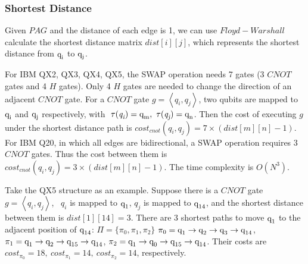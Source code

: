 \documentclass[runningheads]{llncs}
\begin{document}
\subsubsection{Shortest Distance}
Given $PAG$ and the distance of each edge is 1, we can use $Floyd-Warshall$ calculate the shortest distance matrix $dist[i][j]$, which represents the shortest distance from $\textup{q}_{\textup{i}}$ to $\textup{q}_{\textup{j}}$. 

For IBM QX2, QX3, QX4, QX5, the SWAP operation needs 7 gates (3 $CNOT$ gates and 4 $H$ gates). Only 4 $H$ gates are needed to change the direction of an adjacent $CNOT$ gate. 
For a $CNOT$ gate $g=\left \langle  \textit{q}_\textit{i},\textit{q}_\textit{j} \right \rangle $,
two qubits are mapped to $\textup{q}_{\textup{i}}$ and $\textup{q}_{\textup{j}}$ respectively, with $\ \tau(\textit{q}_\textit{i})=\textup{q}_{\textup{m}},\ \tau(\textit{q}_\textit{j})=\textup{q}_{\textup{n}}$. Then the cost of executing $g$ under the shortest distance path is $cost_{cnot}(\textit{q}_\textit{i},\textit{q}_\textit{j})=7 \times( dist[m][n]-1)$. For IBM Q20, in which all edges are bidirectional, a SWAP operation requires 3 $CNOT$ gates. Thus the cost between them is $cost_{cnot}(\textit{q}_\textit{i},\textit{q}_\textit{j})=3 \times( dist[m][n]-1)$. The time complexity is $O (N^{3})$.
\begin{example}
	Take the QX5 structure as an example. Suppose there is a $CNOT$ gate $g=\left \langle  \textit{q}_\textit{i}, \textit{q}_\textit{j} \right \rangle $, \ $\textit{q}_\textit{i}$ is mapped to $\textup{q}_{1}$,  $\textit{q}_\textit{j}$ is mapped to $\textup{q}_{\textup{14}}$, and the shortest distance between them  is $dist[1][14]=3$. There are 3 shortest paths to move $\textup{q}_{\textup{1}}$ to the adjacent position of 
$\textup{q}_{\textup{14}}$:
$\Pi=\{\pi_{0},\pi_{1},\pi_{2}\}$
$\pi_{0}={\textup{q}_{\textup{1}}\rightarrow \textup{q}_{\textup{2}} \rightarrow \textup{q}_{\textup{3}} \rightarrow \textup{q}_{\textup{14}}}$,
$\pi_{1}={\textup{q}_{\textup{1}}\rightarrow \textup{q}_{\textup{2}} \rightarrow \textup{q}_{\textup{15}} \rightarrow \textup{q}_{\textup{14}}}$,
$\pi_{2}={\textup{q}_{\textup{1}}\rightarrow \textup{q}_{\textup{0}} \rightarrow \textup{q}_{\textup{15}} \rightarrow \textup{q}_{\textup{14}}}$.
Their costs are 
$cost_{\pi_{0}}=18,\ cost_{\pi_{1}}=14,\ cost_{\pi_{2}}=14$, respectively.
\end{example}
\end{document}
